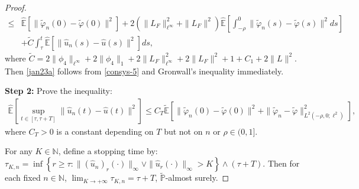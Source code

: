 \documentclass[11pt]{article}
\numberwithin{equation}{section}
\theoremstyle{plain}
\begin{document}
\begin{proof}
\begin{align}
   \le & \widehat{\mathbb{E}} \left[ \|\widetilde{\varphi}_n(0) - \widetilde{\varphi}(0)\|^2 \right]
          + 2 \left( \|L_{F}\|_{\ell^\infty}^2 + \|L_{F}\|^2 \right)
            \widehat{\mathbb{E}}
                     \left[ \int_{-\rho}^{0}
                                  \| \widetilde{ \varphi}_n(s) - \widetilde{\varphi}(s) \|^2 ds
                     \right]   \nonumber\\
        & + \widetilde{C} \int_{\tau}^{t}
                                \widehat{\mathbb{E}} \left[ \|\hat{u}_{n}(s) - \hat{u}(s)\|^2 \right] ds,
 \end{align}
 where
      $\widetilde{C} = 2 \|\phi_4\|_{\ell^\infty} + 2 \|\phi_4\|_1
                                   + 2 \|L_{F}\|_{\ell^\infty}^2 + 2 \|L_{F}\|^2 + 1
                                   + C_1 + 2 \| L \|^2
      $.
Then \eqref{jan23a}
follows from 
  \eqref{consys-5} and Gronwall's inequality
  immediately.
   
 
 {\bf Step 2:}  Prove   the inequality:
 \begin{align}\label{jan23b}
       \widehat{\mathbb{E}}
             \left[ \sup_{t \in [\tau, \tau +T]}
                            \| \hat{u}_n(t) - \hat{u}(t) \|^2 
             \right]
  \le C_T
              \widetilde{\mathbb{E}} 
                   \left[ \| \widetilde{\varphi}_n(0) - \widetilde{\varphi}(0) \|^2  
                            + \| \widetilde{\varphi}_n - \widetilde{\varphi} \|^2_{L^2(-\rho, 0; \ell^2)}     
                  \right],
 \end{align} 
 where  $C_T > 0$
 is a constant depending on $T$ but not on $n$ or $\rho \in (0, 1]$.
 
  For any $K \in \mathbb{N}$, define 
  a  stopping time by:
    $\tau_{K,n}
     = \inf
           \left\{ r \ge \tau:
                     \| (\hat{u}_n)_{r} (\cdot)\|_{\infty}
                     \vee
                     \|\hat{u}_{r}(\cdot)\|_{\infty}
                     > K
           \right\}
       \wedge (\tau + T)$.
 Then for each fixed  $n \in \mathbb{N}$, $\lim_{K \to +\infty} \tau_{K,n} = \tau + T$,  $\widetilde{\mathbb{P}}$-almost surely.
 

\end{proof}
\end{document}
